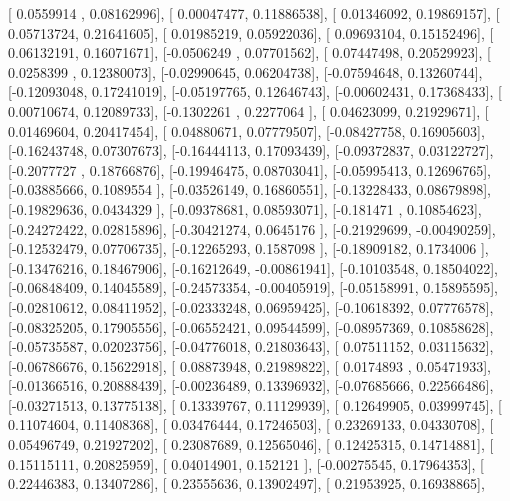 \documentclass{article}
\begin{document}
       [ 0.0559914 ,  0.08162996],
       [ 0.00047477,  0.11886538],
       [ 0.01346092,  0.19869157],
       [ 0.05713724,  0.21641605],
       [ 0.01985219,  0.05922036],
       [ 0.09693104,  0.15152496],
       [ 0.06132191,  0.16071671],
       [-0.0506249 ,  0.07701562],
       [ 0.07447498,  0.20529923],
       [ 0.0258399 ,  0.12380073],
       [-0.02990645,  0.06204738],
       [-0.07594648,  0.13260744],
       [-0.12093048,  0.17241019],
       [-0.05197765,  0.12646743],
       [-0.00602431,  0.17368433],
       [ 0.00710674,  0.12089733],
       [-0.1302261 ,  0.2277064 ],
       [ 0.04623099,  0.21929671],
       [ 0.01469604,  0.20417454],
       [ 0.04880671,  0.07779507],
       [-0.08427758,  0.16905603],
       [-0.16243748,  0.07307673],
       [-0.16444113,  0.17093439],
       [-0.09372837,  0.03122727],
       [-0.2077727 ,  0.18766876],
       [-0.19946475,  0.08703041],
       [-0.05995413,  0.12696765],
       [-0.03885666,  0.1089554 ],
       [-0.03526149,  0.16860551],
       [-0.13228433,  0.08679898],
       [-0.19829636,  0.0434329 ],
       [-0.09378681,  0.08593071],
       [-0.181471  ,  0.10854623],
       [-0.24272422,  0.02815896],
       [-0.30421274,  0.0645176 ],
       [-0.21929699, -0.00490259],
       [-0.12532479,  0.07706735],
       [-0.12265293,  0.1587098 ],
       [-0.18909182,  0.1734006 ],
       [-0.13476216,  0.18467906],
       [-0.16212649, -0.00861941],
       [-0.10103548,  0.18504022],
       [-0.06848409,  0.14045589],
       [-0.24573354, -0.00405919],
       [-0.05158991,  0.15895595],
       [-0.02810612,  0.08411952],
       [-0.02333248,  0.06959425],
       [-0.10618392,  0.07776578],
       [-0.08325205,  0.17905556],
       [-0.06552421,  0.09544599],
       [-0.08957369,  0.10858628],
       [-0.05735587,  0.02023756],
       [-0.04776018,  0.21803643],
       [ 0.07511152,  0.03115632],
       [-0.06786676,  0.15622918],
       [ 0.08873948,  0.21989822],
       [ 0.0174893 ,  0.05471933],
       [-0.01366516,  0.20888439],
       [-0.00236489,  0.13396932],
       [-0.07685666,  0.22566486],
       [-0.03271513,  0.13775138],
       [ 0.13339767,  0.11129939],
       [ 0.12649905,  0.03999745],
       [ 0.11074604,  0.11408368],
       [ 0.03476444,  0.17246503],
       [ 0.23269133,  0.04330708],
       [ 0.05496749,  0.21927202],
       [ 0.23087689,  0.12565046],
       [ 0.12425315,  0.14714881],
       [ 0.15115111,  0.20825959],
       [ 0.04014901,  0.152121  ],
       [-0.00275545,  0.17964353],
       [ 0.22446383,  0.13407286],
       [ 0.23555636,  0.13902497],
       [ 0.21953925,  0.16938865],
\end{document}
